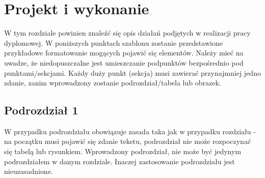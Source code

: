 \section{Projekt i wykonanie}
W tym rozdziale powinien znaleźć się opis działań podjętych w realizacji pracy dyplomowej. W poniższych punktach szablonu zostanie przedstawione przykładowe formatowanie mogących pojawić się elementów. Należy mieć na uwadze, że niedopuszczalne jest umieszczanie podpunktów bezpośrednio pod punktami/sekcjami. Każdy duży punkt (sekcja) musi zawierać przynajmniej jedno zdanie, zanim wprowadzony zostanie podrozdział/tabela lub obrazek.
\subsection{Podrozdział 1}
W przypadku podrozdziału obowiązuje zasada taka jak w przypadku rozdziału - na początku musi pojawić się zdanie tekstu, podrozdział nie może rozpoczynać się tabelą lub rysunkiem. Wprowadzony podrozdział, nie może być jedynym podrozdziałem w danym rozdziale. Inaczej zastosowanie podrozdziału jest nieuzasadnione. 
